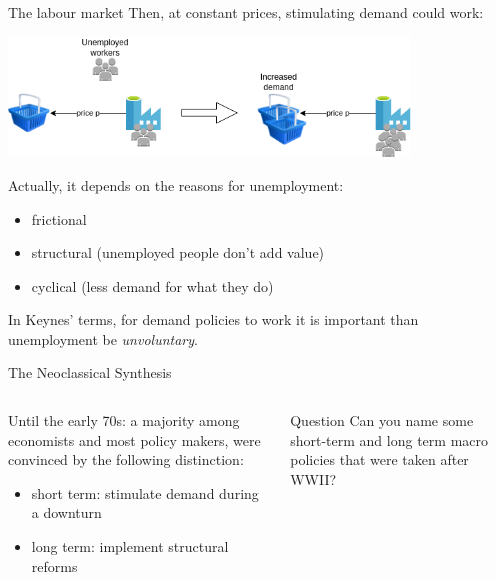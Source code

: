 \begin{frame}{The labour market}
\protect\hypertarget{the-labour-market}{}
Then, at constant prices, stimulating demand could work:

\includegraphics[width=0.8\textwidth,height=\textheight]{assets/unemployment.png}

Actually, it depends on the reasons for unemployment:

\begin{itemize}
\tightlist
\item
  frictional
\item
  structural (unemployed people don't add value)
\item
  cyclical (less demand for what they do)
\end{itemize}

In Keynes' terms, for demand policies to work it is important than
unemployment be \emph{unvoluntary}.
\end{frame}

\begin{frame}{The Neoclassical Synthesis}
\protect\hypertarget{the-neoclassical-synthesis}{}
\begin{columns}[T]
\begin{column}{0.48\textwidth}
Until the early 70s: a majority among economists and most policy makers,
were convinced by the following distinction:

\begin{itemize}
\tightlist
\item
  short term: stimulate demand during a downturn
\item
  long term: implement structural reforms
\end{itemize}
\end{column}

\begin{column}{0.48\textwidth}
\begin{block}{Question}
\protect\hypertarget{question}{}
Can you name some short-term and long term macro policies that were
taken after WWII?
\end{block}
\end{column}
\end{columns}
\end{frame}

